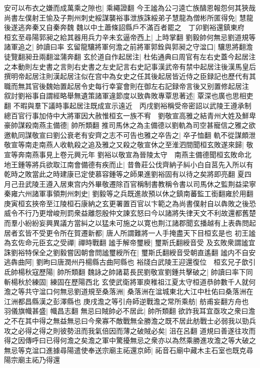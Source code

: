 安可以布衣之嫌而成萬乘之隙也|{
	乘繩證翻}
今王謐為公刁逵亡族醻恩報怨何其狹哉　尚書左僕射王愉及子荆州刺史綏謀襲裕事泄族誅綏弟子慧龍為僧彬所匿得免|{
	慧龍後遂逃奔秦又自秦奔魏}
魏以中土蕭條詔縣戶不滿百者罷之　丁卯劉裕還鎮東府　桓玄至尋陽郭昶之給其器用兵力辛未玄逼帝西上|{
	上時掌翻}
劉毅帥何無忌劉道規等諸軍追之|{
	帥讀曰率}
玄留龍驤將軍何澹之前將軍郭銓與郭昶之守湓口|{
	驤思將翻澹徒覽翻昶丑兩翻湓蒲奔翻}
玄於道自作起居注|{
	杜佑通典曰周官有左右史蓋今起居注之本動則左史書之言則右史書之左史記言右史記事漢武帝有禁中起居注後漢馬皇后撰明帝起居注則漢起居注似在宫中為女史之任其後起居皆近侍之臣録記也歷代有其職而無其官後魏始置起居令史每行幸宴會則在御左右記録帝言後又别置修起居注}
叙討劉裕事自謂經略舉無遺策諸軍違節度以致犇敗專覃思著述|{
	覃深也廣也思相吏翻}
不暇與羣下議時事起居注既成宣示遠近　丙戌劉裕稱受帝密詔以武陵王遵承制總百官行事加侍中大將軍因大赦惟桓玄一族不宥　劉敬宣高雅之結青州大姓及鮮卑豪帥謀殺南燕主備德|{
	帥所類翻}
推司馬休之為主備德以劉軌為司空甚寵信之雅之欲邀軌同謀敬宣曰劉公衰老有安齊之志不可告也雅之卒告之|{
	卒子恤翻}
軌不從謀頗泄敬宣等南走南燕人收軌殺之追及雅之又殺之敬宣休之至淮泗間聞桓玄敗遂來歸|{
	敬宣等奔南燕事見上卷元興元年}
劉裕以敬宣為晉陵太守　南燕主備德聞桓玄敗命北地王鍾等將兵欲取江南會備德有疾而止|{
	昔魯莊公伐齊納子糾小白自莒先入所以有乾時之敗當此之時建康已定使慕容鍾等之師果進劉裕固有以待之矣將即亮翻}
夏四月己丑武陵王遵入居東宫内外畢敬遷除百官稱制書教稱令書以司馬休之監荆益梁寧秦雍六州諸軍事領荆州刺史|{
	劉毅等之兵既進故預以休之鎮南蕃監工銜翻雍於用翻}
庚寅桓玄挾帝至江陵桓石康納之玄更署置百官以卞範之為尚書僕射自以犇敗之後恐威令不行乃更增峻刑罰衆益離怨殷仲文諫玄怒曰今以諸將失律天文不利故還都舊楚而羣小紛紛妄興異議方當糾之以猛未可施之以寛也荆江諸郡聞玄播越有上表犇問起居者玄皆不受更令所在賀遷新都|{
	唐人所謂難將一人手掩盡天下目桓玄是也}
初王謐為玄佐命元臣玄之受禪|{
	禪時戰翻}
謐手解帝璽綬|{
	璽斯氏翻綬音受}
及玄敗衆謂謐宜誅劉裕特保全之劉毅嘗因朝會問謐璽綬所在|{
	璽斯氏翻綬音受朝直遙翻}
謐内不自安逃犇曲阿|{
	劉昫曰唐潤州丹楊縣古曲阿縣也}
裕牋白武陵王迎還復位　桓玄兄子歆引氐帥楊秋寇歷陽|{
	帥所類翻}
魏詠之帥諸葛長民劉敬宣劉鍾共擊破之|{
	帥讀曰率下同}
斬楊秋於練固|{
	練固在歷陽西北}
玄使武衛將軍庾稚祖江夏太守桓道恭帥數千人就何澹之等共守湓口何無忌劉道規至桑落洲|{
	桑落洲在湓城東北大江中杜佑曰桑落洲在江洲都昌縣漢之彭澤縣也}
庚戌澹之等引舟師逆戰澹之常所乘舫|{
	舫甫妄翻方舟也}
羽儀旗幟甚盛|{
	幟昌志翻}
無忌曰賊帥必不居此|{
	帥所類翻}
欲詐我耳宜亟攻之衆曰澹之不在其中得之無益無忌曰今衆寡不敵戰無全勝澹之既不居此舫戰士必弱我以勁兵攻之必得之得之則彼勢沮而我氣倍因而薄之破賊必矣|{
	沮在呂翻}
道規曰善遂往攻而得之因傳呼曰已得何澹之矣澹之軍中驚擾無忌之衆亦以為然乘勝進攻澹之等大破之無忌等克湓口進據尋陽遣使奉送宗廟主祏還京師|{
	祏音石廟中藏木主石室也既克尋陽宗廟主祏乃得還}
